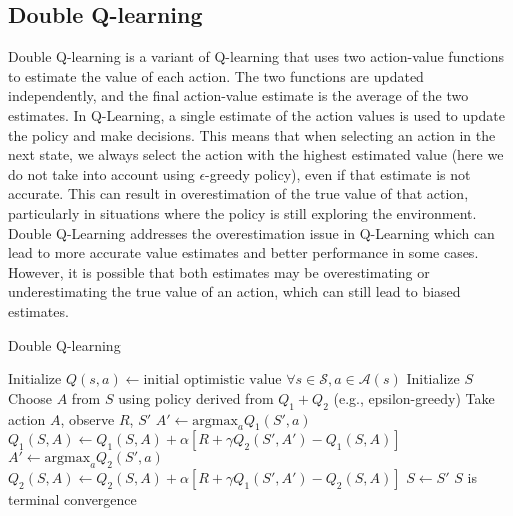 \subsection{Double Q-learning}
Double Q-learning is a variant of Q-learning that uses two action-value functions to estimate the value of each action. The two functions are updated independently, and the final action-value estimate is the average of the two estimates. In Q-Learning, a single estimate of the action values is used to update the policy and make decisions. This means that when selecting an action in the next state, we always select the action with the highest estimated value (here we do not take into account using $\epsilon$-greedy policy), even if that estimate is not accurate. This can result in overestimation of the true value of that action, particularly in situations where the policy is still exploring the environment. Double Q-Learning addresses the overestimation issue in Q-Learning which can lead to more accurate value estimates and better performance in some cases. However, it is possible that both estimates may be overestimating or underestimating the true value of an action, which can still lead to biased estimates.
\begin{algorithm}
\caption{Double Q-learning}\label{algo:DQL}
\begin{algorithmic}[1]
\State Initialize 
\State $Q(s,a) \gets \text{initial optimistic value } \forall s\in \mathcal{S}, a\in \mathcal{A}(s)$
\Repeat
\State Initialize $S$
\Repeat
\State Choose $A$ from $S$ using policy derived from $Q_1+Q_2$ (e.g., epsilon-greedy)
\State Take action $A$, observe $R$, $S'$
\State $A' \gets \text{argmax}_a Q_1(S',a)$
\State $Q_1(S,A) \gets Q_1(S,A) + \alpha [R + \gamma Q_2(S',A') - Q_1(S,A)]$
\Else
\State $A' \gets \text{argmax}_a Q_2(S',a)$
\State $Q_2(S,A) \gets Q_2(S,A) + \alpha [R + \gamma Q_1(S',A') - Q_2(S,A)]$
\EndIf
\State $S \gets S'$
\Until $S$ is terminal
\Until convergence
\end{algorithmic}
\end{algorithm}